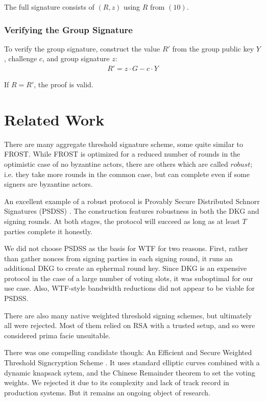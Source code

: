 \documentclass{article}
\begin{document}
The full signature consists of $(R, z)$ using $R$ from $(10)$.

\subsubsection{
  Verifying the Group Signature
}

To verify the group signature, construct the value $R'$ from the group public key $Y$, challenge $c$, and group signature $z$:
\begin{align}
  R' = z \cdot G - c \cdot Y
\end{align}

If $R = R'$, the proof is valid.

\newpage
\onecolumn
\section{
  Related Work
}

There are many aggregate threshold signature scheme, some quite similar to FROST.  While FROST is optimized for a reduced number of rounds in the optimistic case of no byzantine actors, there are others which are called $robust$; i.e. they take more rounds in the common case, but can complete even if some signers are byzantine actors.

An excellent example of a robust protocol is Provably Secure Distributed Schnorr Signatures (PSDSS) \cite{psdss}.  The construction features robustness in both the DKG and signing rounds.  At both stages, the protocol will succeed as long as at least $T$ parties complete it honestly.

We did not choose PSDSS as the basis for WTF for two reasons.  First, rather than gather nonces from signing parties in each signing round, it runs an additional DKG to create an ephermal round key.  Since DKG is an expensive protocol in the case of a large number of voting slots, it was suboptimal for our use case.  Also, WTF-style bandwidth reductions did not appear to be viable for PSDSS.

There are also many native weighted threshold signing schemes, but ultimately all were rejected.  Most of them relied on RSA with a trusted setup, and so were considered prima facie unsuitable.

There was one compelling candidate though: An Efficient and Secure Weighted Threshold Signcryption Scheme \cite{eswtss}.  It uses standard elliptic curves combined with a dynamic knapsack sytem, and the Chinese Remainder theorem to set the voting weights.  We rejected it due to its complexity and lack of track record in production systems.  But it remains an ongoing object of research.
\end{document}
